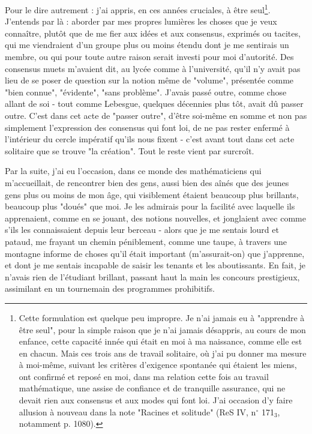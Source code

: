 Pour le dire autrement : j'ai appris, en ces années cruciales, à être seul\footnote{Cette formulation est quelque peu impropre. Je n'ai jamais eu à "apprendre à être seul", pour la simple raison que je n'ai jamais désappris, au cours de mon enfance, cette capacité innée qui était en moi à ma naissance, comme elle est en chacun. Mais ces trois ans de travail solitaire, où j'ai pu donner ma mesure à moi-même, suivant les critères d'exigence spontanée qui étaient les miens, ont confirmé et reposé en moi, dans ma relation cette fois au travail mathématique, une assise de confiance et de tranquille assurance, qui ne devait rien aux consensus et aux modes qui font loi. J'ai occasion d'y faire allusion à nouveau dans la note "Racines et solitude" (ReS IV, n$^{\circ}$ 171$_3$, notamment p. 1080).}. J'entends par là : aborder par mes propres lumières les choses que je veux connaître, plutôt que de me fier aux idées et aux consensus, exprimés ou tacites, qui me viendraient d'un groupe plus ou moins étendu dont je me sentirais un membre, ou qui pour toute autre raison serait investi pour moi d'autorité. Des consensus muets m'avaient dit, au lycée comme à l'université, qu'il n'y avait pas lieu de se poser de question sur la notion même de "volume", présentée comme "bien connue", "évidente", "sans problème". J'avais passé outre, comme chose allant de soi - tout comme Lebesgue, quelques décennies plus tôt, avait dû passer outre. C'est dans cet acte de "passer outre", d'être soi-même en somme et non pas simplement l'expression des consensus qui font loi, de ne pas rester enfermé à l'intérieur du cercle impératif qu'ils nous fixent - c'est avant tout dans cet acte solitaire que se trouve "la création". Tout le reste vient par surcroît.

Par la suite, j'ai eu l'occasion, dans ce monde des mathématiciens qui m'accueillait, de rencontrer bien des gens, aussi bien des aînés que des jeunes gens plus ou moins de mon âge, qui visiblement étaient beaucoup plus brillants, beaucoup plus "doués" que moi. Je les admirais pour la facilité avec laquelle ils apprenaient, comme en se jouant, des notions nouvelles, et jonglaient avec comme s'ils les connaissaient depuis leur berceau - alors que je me sentais lourd et pataud, me frayant un chemin péniblement, comme une taupe, à travers une montagne informe de choses qu'il était important (m'assurait-on) que j'apprenne, et dont je me sentais incapable de saisir les tenants et les aboutissants. En fait, je n'avais rien de l'étudiant brillant, passant haut la main les concours prestigieux, assimilant en un tournemain des programmes prohibitifs.

